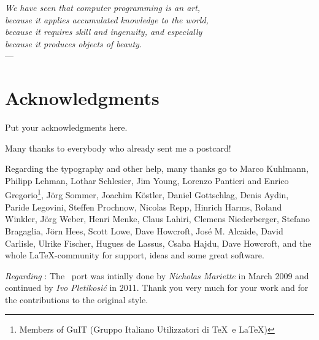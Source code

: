 
\begin{flushright}{\slshape
    We have seen that computer programming is an art, \\
    because it applies accumulated knowledge to the world, \\
    because it requires skill and ingenuity, and especially \\
    because it produces objects of beauty.} \\ \medskip
    ---  \citep{knuth:1974}
\end{flushright}



\bigskip

\begingroup
\let\clearpage\relax
\let\cleardoublepage\relax
\let\cleardoublepage\relax
\chapter*{Acknowledgments}
Put your acknowledgments here.

Many thanks to everybody who already sent me a postcard!

Regarding the typography and other help, many thanks go to Marco
Kuhlmann, Philipp Lehman, Lothar Schlesier, Jim Young, Lorenzo
Pantieri and Enrico Gregorio\footnote{Members of GuIT (Gruppo
Italiano Utilizzatori di \TeX\ e \LaTeX )}, J\"org Sommer,
Joachim K\"ostler, Daniel Gottschlag, Denis Aydin, Paride
Legovini, Steffen Prochnow, Nicolas Repp, Hinrich Harms,
Roland Winkler, Jörg Weber, Henri Menke, Claus Lahiri,
Clemens Niederberger, Stefano Bragaglia, Jörn Hees,
Scott Lowe, Dave Howcroft, Jos\'e M. Alcaide, David Carlisle,
Ulrike Fischer, Hugues de Lassus, Csaba Hajdu, Dave Howcroft, 
and the whole \LaTeX-community for support, ideas and
some great software.

\bigskip

\noindent\emph{Regarding \mLyX}: The \mLyX\ port was intially done by
\emph{Nicholas Mariette} in March 2009 and continued by
\emph{Ivo Pletikosi\'c} in 2011. Thank you very much for your
work and for the contributions to the original style.


\endgroup

